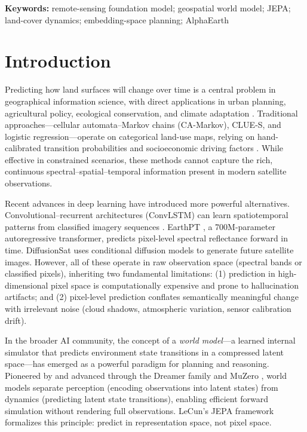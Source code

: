 \documentclass{article}
\newenvironment{keywords}{\par\noindent\textbf{Keywords:} }{\par}
\begin{document}
\begin{keywords}
remote-sensing foundation model; geospatial world model; JEPA; land-cover dynamics; embedding-space planning; AlphaEarth
\end{keywords}

\section{Introduction}
\label{sec:intro}

Predicting how land surfaces will change over time is a central problem in geographical information science, with direct applications in urban planning, agricultural policy, ecological conservation, and climate adaptation \citep{verburg2004lulc}. Traditional approaches---cellular automata--Markov chains (CA-Markov), CLUE-S, and logistic regression---operate on categorical land-use maps, relying on hand-calibrated transition probabilities and socioeconomic driving factors \citep{veldkamp2004clues}. While effective in constrained scenarios, these methods cannot capture the rich, continuous spectral--spatial--temporal information present in modern satellite observations.

Recent advances in deep learning have introduced more powerful alternatives. Convolutional--recurrent architectures (ConvLSTM) can learn spatiotemporal patterns from classified imagery sequences \citep{shi2015convlstm}. EarthPT \citep{smith2023earthpt}, a 700M-parameter autoregressive transformer, predicts pixel-level spectral reflectance forward in time. DiffusionSat \citep{khanna2023diffusionsat} uses conditional diffusion models to generate future satellite images. However, all of these operate in raw observation space (spectral bands or classified pixels), inheriting two fundamental limitations: (1) prediction in high-dimensional pixel space is computationally expensive and prone to hallucination artifacts; and (2) pixel-level prediction conflates semantically meaningful change with irrelevant noise (cloud shadows, atmospheric variation, sensor calibration drift).

In the broader AI community, the concept of a \textit{world model}---a learned internal simulator that predicts environment state transitions in a compressed latent space---has emerged as a powerful paradigm for planning and reasoning. Pioneered by \citet{ha2018world} and advanced through the Dreamer family \citep{hafner2023dreamerv3} and MuZero \citep{schrittwieser2020muzero}, world models separate perception (encoding observations into latent states) from dynamics (predicting latent state transitions), enabling efficient forward simulation without rendering full observations. LeCun's JEPA framework \citep{lecun2022jepa} formalizes this principle: predict in representation space, not pixel space.
\end{document}
